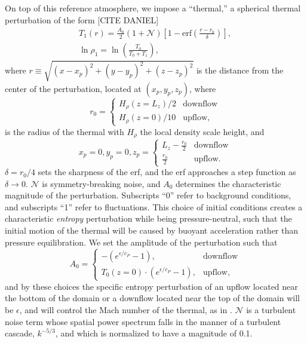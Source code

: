 \documentclass[twocolumn, amsmath, amsfonts, amssymb]{aastex62}
\begin{document}
On top of this reference atmosphere, we impose a ``thermal,''
a spherical thermal perturbation of the form [CITE DANIEL]
\begin{gather}
T_1(r) =  \frac{A_0}{2}\left(1 + \mathcal{N}\right) \left[1 - \text{erf}\left(\frac{r - r_0}{\delta}\right)\right], \\
\ln\rho_1 = \ln\left(\frac{T_0}{T_0 + T_1}\right),
\end{gather}
where $r \equiv \sqrt{(x-x_p)^2 + (y-y_p)^2 + (z-z_p)^2}$ is the distance
from the center of the perturbation, located at $(x_p, y_p, z_p)$, where
$$
r_0 =
\begin{cases}
H_\rho(z=L_z) / 2 & \text{downflow} \\
H_\rho(z=0) / 10  & \text{upflow},
\end{cases}
$$ 
is the radius of the thermal with $H_\rho$ the local density scale height, and 
$$
x_p = 0, y_p = 0, z_p = 
\begin{cases} 
L_z - \frac{r_0}{2} & \text{downflow} \\
\frac{r_0}{2} & \text{upflow}.
\end{cases}
$$
 $\delta = r_0 / 4$ sets the sharpness of the erf, and the erf approaches a step
function as $\delta \rightarrow 0$. 
$\mathcal{N}$ is symmetry-breaking noise, and $A_0$ determines the characteristic
magnitude of the perturbation. Subscripts ``0'' refer to background conditions,
and subscripts ``1'' refer to fluctuations. This choice of initial conditions
creates a characteristic \emph{entropy} perturbation while being pressure-neutral,
such that the initial motion of the thermal will be caused by buoyant acceleration
rather than pressure equilibration.
We set the amplitude of the perturbation such that
\begin{equation}
A_0 = \begin{cases}
- (e^{\epsilon/c_P} - 1), & \text{downflow}\\
T_0(z=0)\cdot(e^{\epsilon/c_P} - 1), & \text{upflow},
\end{cases}
\end{equation}
and by these choices the specific entropy perturbation 
of an upflow located near the bottom of
the domain or a downflow located near the top of the domain will be $\epsilon$,
and will control the Mach number of the thermal, as in \cite{anders&brown2017}.
$\mathcal{N}$ is a turbulent noise term whose spatial power spectrum falls
in the manner of a turbulent cascade, $k^{-5/3}$, and which is normalized to
have a magnitude of 0.1.
\end{document}
